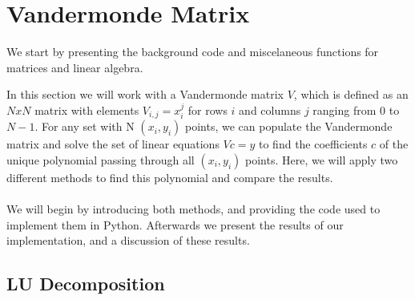 \section{Vandermonde Matrix}

We start by presenting the background code and miscelaneous functions for matrices and linear algebra.





In this section we will work with a Vandermonde matrix $V$, which is defined as an $NxN$ matrix with elements $V_{i,j} = x_i^j$ for rows $i$ and columns $j$ ranging from $0$ to $N-1$. For any set with N $(x_i, y_i)$ points, we can populate the Vandermonde matrix and solve the set of linear equations $Vc = y$ to find the coefficients $c$ of the unique polynomial passing through all $(x_i, y_i)$ points. Here, we will apply two different methods to find this polynomial and compare the results. 
\\ \\
We will begin by introducing both methods, and providing the code used to implement them in Python. Afterwards we present the results of our implementation, and a discussion of these results.

\subsection{LU Decomposition}

